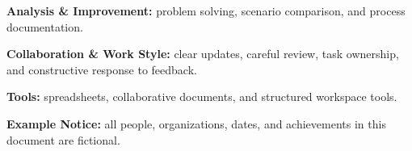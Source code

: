 \begin{cvbody}
\end{cvbody}

\begin{cvbody}
\textbf{Analysis \& Improvement:} problem solving, scenario comparison, and process documentation.\par
\textbf{Collaboration \& Work Style:} clear updates, careful review, task ownership, and constructive response to feedback.\par
\textbf{Tools:} spreadsheets, collaborative documents, and structured workspace tools.\par
\textbf{Example Notice:} all people, organizations, dates, and achievements in this document are fictional.
\end{cvbody}

